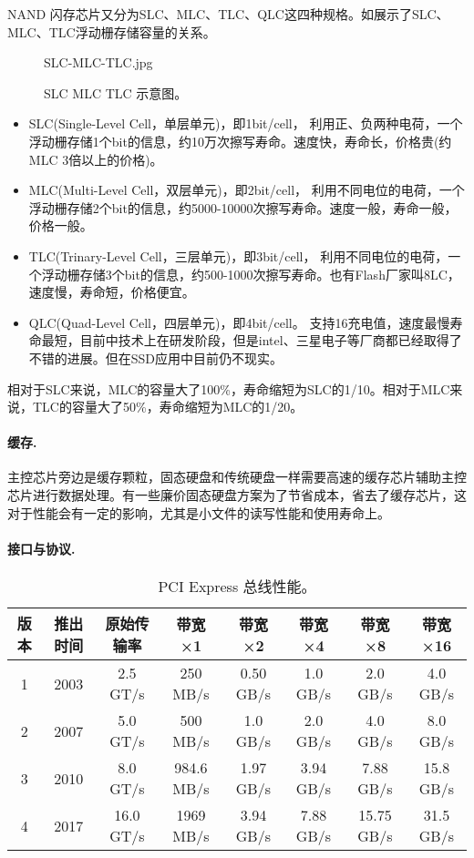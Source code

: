 \documentclass[final]{cvpr}
\newcommand{\mypara}[1]{\paragraph{#1.}}
\begin{document}
NAND 闪存芯片又分为SLC、MLC、TLC、QLC这四种规格。如展示了SLC、MLC、TLC浮动栅存储容量的关系。
\begin{figure}
  	\begin{overpic}[width=\columnwidth]{SLC-MLC-TLC.jpg}\end{overpic}
    \caption{SLC MLC TLC 示意图\cite{Web/NAND}。}\label{fig:slc-mlc-tlc}
\end{figure}
\begin{itemize}
    \item SLC(Single-Level Cell，单层单元)，即1bit/cell，
    利用正、负两种电荷，一个浮动栅存储1个bit的信息，约10万次擦写寿命。速度快，寿命长，价格贵(约MLC 3倍以上的价格)。
    \item MLC(Multi-Level Cell，双层单元)，即2bit/cell，
    利用不同电位的电荷，一个浮动栅存储2个bit的信息，约5000-10000次擦写寿命。速度一般，寿命一般，价格一般。
    \item TLC(Trinary-Level Cell，三层单元)，即3bit/cell，
    利用不同电位的电荷，一个浮动栅存储3个bit的信息，约500-1000次擦写寿命。也有Flash厂家叫8LC，速度慢，寿命短，价格便宜。
    \item QLC(Quad-Level Cell，四层单元)，即4bit/cell。
    支持16充电值，速度最慢寿命最短，目前中技术上在研发阶段，但是intel、三星电子等厂商都已经取得了不错的进展。但在SSD应用中目前仍不现实。
\end{itemize}

相对于SLC来说，MLC的容量大了100\%，寿命缩短为SLC的1/10。相对于MLC来说，TLC的容量大了50\%，寿命缩短为MLC的1/20。

\mypara{缓存}
主控芯片旁边是缓存颗粒，固态硬盘和传统硬盘一样需要高速的缓存芯片辅助主控芯片进行数据处理。有一些廉价固态硬盘方案为了节省成本，省去了缓存芯片，这对于性能会有一定的影响，尤其是小文件的读写性能和使用寿命上。

\mypara{接口与协议}

\begin{table*}[]\centering
\begin{tabular}{cccccccc}
\hline
版本 & 推出时间 & 原始传输率    & 带宽×1      & 带宽×2     & 带宽×4     & 带宽×8      & 带宽×16    \\ \hline
1  & 2003 & 2.5 GT/s  & 250 MB/s   & 0.50 GB/s & 1.0 GB/s  & 2.0 GB/s   & 4.0 GB/s  \\
2  & 2007 & 5.0 GT/s  & 500 MB/s   & 1.0 GB/s  & 2.0 GB/s  & 4.0 GB/s   & 8.0 GB/s  \\
3  & 2010 & 8.0 GT/s  & 984.6 MB/s & 1.97 GB/s & 3.94 GB/s & 7.88 GB/s  & 15.8 GB/s \\
4  & 2017 & 16.0 GT/s & 1969 MB/s  & 3.94 GB/s & 7.88 GB/s & 15.75 GB/s & 31.5 GB/s \\ \hline
\end{tabular}
\caption{PCI Express 总线性能\cite{Web/wiki-pcie}。}\label{table:pcie}
\end{table*}
\end{document}
